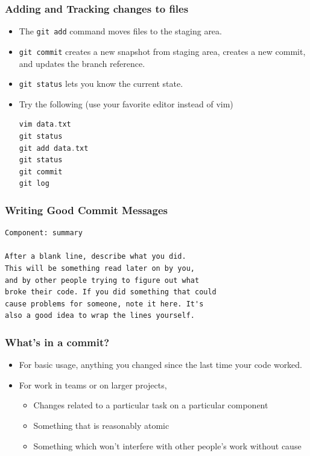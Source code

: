 \documentclass{beamer}
\begin{document}
\begin{frame}[fragile]
\frametitle{Adding and Tracking changes to files}
\begin{itemize}
\item The \lstinline{git add} command moves files to the staging area.
\item \lstinline{git commit} creates a new snapshot from staging area, creates a new commit, and updates the branch reference.
\item \lstinline{git status} lets you know the current state.
\item Try the following (use your favorite editor instead of vim)
\begin{lstlisting}[language=C++]
vim data.txt
git status
git add data.txt
git status
git commit
git log
\end{lstlisting}
\end{itemize}
\end{frame}

\begin{frame}[fragile]
\frametitle{Writing Good Commit Messages}
\begin{verbatim}
Component: summary

After a blank line, describe what you did. 
This will be something read later on by you,
and by other people trying to figure out what
broke their code. If you did something that could 
cause problems for someone, note it here. It's
also a good idea to wrap the lines yourself.
\end{verbatim}
\end{frame}

\begin{frame}[fragile]
\frametitle{What's in a commit?}
\begin{itemize}
\item For basic usage, anything you changed since the last time your code worked.
\item For work in teams or on larger projects,
\begin{itemize}
\item Changes related to a particular task on a particular component
\item Something that is reasonably atomic
\item Something which won't interfere with other people's work without cause
\end{itemize}
\end{itemize}
\end{frame}
\end{document}
